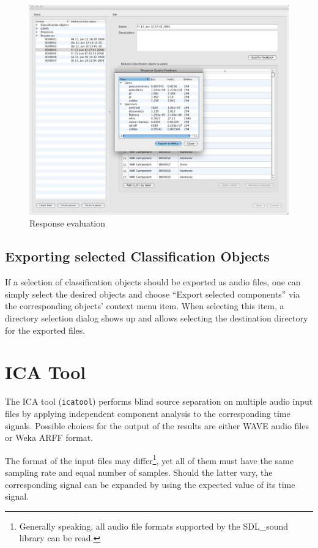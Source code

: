 \begin{figure}
    \includegraphics[width=\textwidth]{images/QualityFeedback.png}
    \caption{%
        \label{figure:QualityFeedback}
        Response evaluation
    }
\end{figure}


\subsection{Exporting selected Classification Objects}

If a selection of classification objects should be exported as audio files, one
can simply select the desired objects and choose ``Export selected components''
via the corresponding objects' context menu item. When selecting this item, a
directory selection dialog shows up and allows selecting the destination
directory for the exported files.


\section{ICA Tool}

The ICA tool (\verb!icatool!) performs blind source separation on multiple audio
input files by applying independent component analysis to the corresponding time
signals. Possible choices for the output of the results are either WAVE audio
files or Weka ARFF format.

The format of the input files may differ\footnote{Generally speaking, all audio
  file formats supported by the SDL\_sound library can be read.}, yet all of them
must have the same sampling rate and equal number of samples. Should the latter
vary, the corresponding signal can be expanded by using the expected value of
its time signal.

